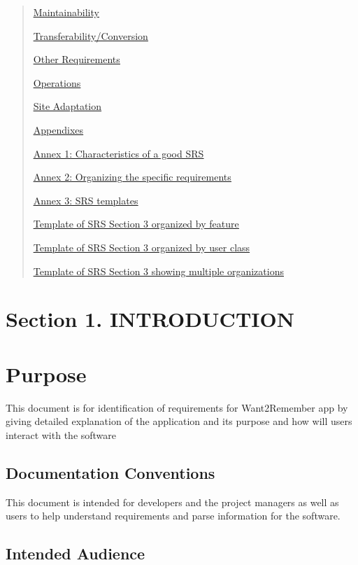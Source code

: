 \documentclass[
]{article}
\begin{document}
\begin{quote}
\hyperref[_e5po9qanxzue]{\ul{Maintainability}}

\hyperref[_rj4tlkisvdbj]{\ul{Transferability/Conversion}}

\hyperref[other-requirements]{\ul{Other Requirements}}

\hyperref[legal-requirements]{\ul{Operations}}

\hyperref[ethical-requirements]{\ul{Site Adaptation}}

\hyperref[appendixes]{\ul{Appendixes}}

\hyperref[_clp35ii7xzat]{\ul{Annex 1: Characteristics of a good SRS}}

\hyperref[_l587f99ytp53]{\ul{Annex 2: Organizing the specific
requirements}}

\hyperref[_lg3ompi10x86]{\ul{Annex 3: SRS templates}}

\hyperref[_fq84tbgccxb3]{\ul{Template of SRS Section 3 organized by
feature}}

\hyperref[_vpigomc8pdzb]{\ul{Template of SRS Section 3 organized by user
class}}

\hyperref[_8avjwjy42bpe]{\ul{Template of SRS Section 3 showing multiple
organizations}}
\end{quote}

\section{Section 1. INTRODUCTION}\label{section-1.-introduction}

\section{Purpose}\label{purpose}

This document is for identification of requirements for Want2Remember
app by giving detailed explanation of the application and its purpose
and how will users interact with the software

\subsection{Documentation Conventions}\label{documentation-conventions}

This document is intended for developers and the project managers as
well as users to help understand requirements and parse information for
the software.

\subsection{Intended Audience}\label{intended-audience}
\end{document}
